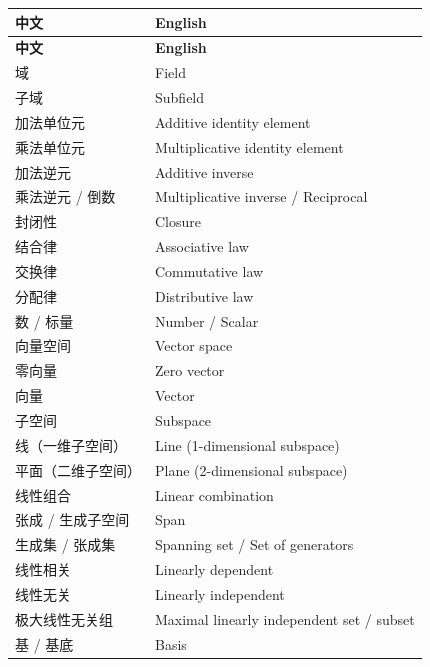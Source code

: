 \documentclass{ctexart}
\begin{document}
	\begin{center}
		\setlength\LTleft{0pt}
		\setlength\LTright{0pt}
		\begin{longtable}{|>{\raggedright\arraybackslash}p{5cm}|>{\raggedright\arraybackslash}p{8cm}|}
			\hline
			\rowcolor{gray!35}
			\textbf{中文} & \textbf{English} \\
			\hline
			\endfirsthead

			\hline
			\rowcolor{gray!35}
			\textbf{中文} & \textbf{English} \\
			\hline
			\endhead

			\hline
			\endfoot

			\hline
			\endlastfoot

			域 & Field \\
			子域 & Subfield \\
			加法单位元 & Additive identity element \\
			乘法单位元 & Multiplicative identity element \\
			加法逆元 & Additive inverse \\
			乘法逆元 / 倒数 & Multiplicative inverse / Reciprocal \\
			封闭性 & Closure \\
			结合律 & Associative law \\
			交换律 & Commutative law \\
			分配律 & Distributive law \\
			数 / 标量 & Number / Scalar \\
			向量空间 & Vector space \\
			零向量 & Zero vector \\
			向量 & Vector \\
			子空间 & Subspace \\
			线（一维子空间） & Line (1-dimensional subspace) \\
			平面（二维子空间） & Plane (2-dimensional subspace) \\
			线性组合 & Linear combination \\
			张成 / 生成子空间 & Span \\
			生成集 / 张成集 & Spanning set / Set of generators \\
			线性相关 & Linearly dependent \\
			线性无关 & Linearly independent \\
			极大线性无关组 & Maximal linearly independent set / subset \\
			基 / 基底 & Basis \\

\end{longtable}
\end{center}
\end{document}
